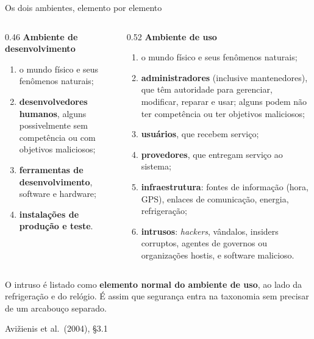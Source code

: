 \documentclass{beamer}
\newcommand{\sect}[1]{\par\smallskip\hfill{\tiny\color{black!55}Avi\v{z}ienis et al.\ (2004), #1}}
\begin{document}
\begin{frame}{Os dois ambientes, elemento por elemento}
    \scriptsize
    \begin{columns}[T]
        \begin{column}{0.46\textwidth}
            \textbf{Ambiente de desenvolvimento}
            \begin{enumerate}
                \item o mundo f\'isico e seus fen\^omenos naturais;
                \item \textbf{desenvolvedores humanos}, alguns possivelmente sem compet\^encia ou com objetivos maliciosos;
                \item \textbf{ferramentas de desenvolvimento}, software e hardware;
                \item \textbf{instala\c{c}\~oes de produ\c{c}\~ao e teste}.
            \end{enumerate}
        \end{column}
        \begin{column}{0.52\textwidth}
            \textbf{Ambiente de uso}
            \begin{enumerate}
                \item o mundo f\'isico e seus fen\^omenos naturais;
                \item \textbf{administradores} (inclusive mantenedores), que t\^em autoridade para gerenciar, modificar, reparar e usar; alguns podem n\~ao ter compet\^encia ou ter objetivos maliciosos;
                \item \textbf{usu\'arios}, que recebem servi\c{c}o;
                \item \textbf{provedores}, que entregam servi\c{c}o ao sistema;
                \item \textbf{infraestrutura}: fontes de informa\c{c}\~ao (hora, GPS), enlaces de comunica\c{c}\~ao, energia, refrigera\c{c}\~ao;
                \item \textbf{intrusos}: \textit{hackers}, v\^andalos, insiders corruptos, agentes de governos ou organiza\c{c}\~oes hostis, e software malicioso.
            \end{enumerate}
        \end{column}
    \end{columns}
    \medskip
    \begin{ancora}
        \scriptsize
        O intruso \'e listado como \textbf{elemento normal do ambiente de uso}, ao lado da refrigera\c{c}\~ao e do rel\'ogio. \'E assim que seguran\c{c}a entra na taxonomia sem precisar de um arcabou\c{c}o separado.
    \end{ancora}
    \sect{\S3.1}
\end{frame}
\end{document}
